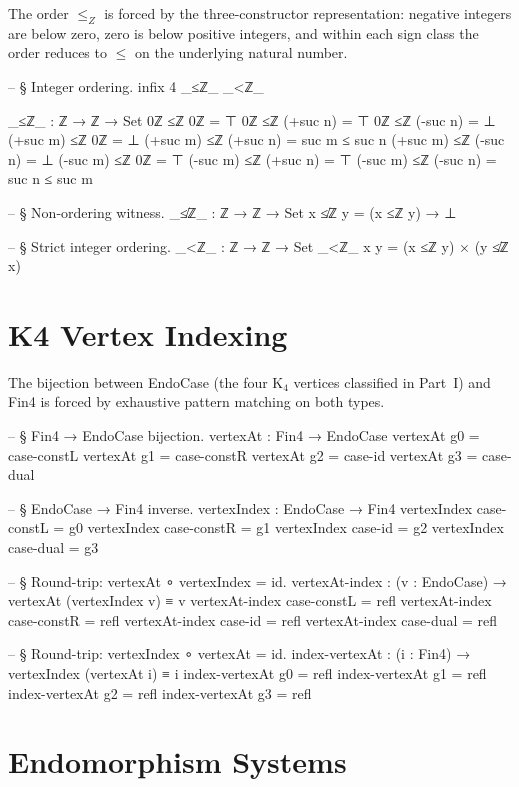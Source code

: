 \documentclass[11pt,a4paper]{book}
\def\mathbb#1{#1}%
\def\texttt#1{#1}%
\def\texorpdfstring#1#2{#2}%
\begin{document}
The order $\le_{\mathbb{Z}}$ is forced by the three-constructor representation:
negative integers are below zero, zero is below positive integers, and within each
sign class the order reduces to $\le$ on the underlying natural number.

\begin{code}
-- § Integer ordering.
infix 4 _≤ℤ_ _<ℤ_

_≤ℤ_ : ℤ → ℤ → Set
0ℤ ≤ℤ 0ℤ = ⊤
0ℤ ≤ℤ (+suc n) = ⊤
0ℤ ≤ℤ (-suc n) = ⊥
(+suc m) ≤ℤ 0ℤ = ⊥
(+suc m) ≤ℤ (+suc n) = suc m ≤ suc n
(+suc m) ≤ℤ (-suc n) = ⊥
(-suc m) ≤ℤ 0ℤ = ⊤
(-suc m) ≤ℤ (+suc n) = ⊤
(-suc m) ≤ℤ (-suc n) = suc n ≤ suc m

-- § Non-ordering witness.
_≰ℤ_ : ℤ → ℤ → Set
x ≰ℤ y = (x ≤ℤ y) → ⊥

-- § Strict integer ordering.
_<ℤ_ : ℤ → ℤ → Set
_<ℤ_ x y = (x ≤ℤ y) × (y ≰ℤ x)
\end{code}

\section{K\texorpdfstring{$_4$}{4} Vertex Indexing}

The bijection between \texttt{EndoCase} (the four K$_4$ vertices classified in
Part~I) and \texttt{Fin4} is forced by exhaustive pattern matching on both types.

\begin{code}
-- § Fin4 → EndoCase bijection.
vertexAt : Fin4 → EndoCase
vertexAt g0 = case-constL
vertexAt g1 = case-constR
vertexAt g2 = case-id
vertexAt g3 = case-dual

-- § EndoCase → Fin4 inverse.
vertexIndex : EndoCase → Fin4
vertexIndex case-constL = g0
vertexIndex case-constR = g1
vertexIndex case-id     = g2
vertexIndex case-dual   = g3

-- § Round-trip: vertexAt ∘ vertexIndex = id.
vertexAt-index : (v : EndoCase) → vertexAt (vertexIndex v) ≡ v
vertexAt-index case-constL = refl
vertexAt-index case-constR = refl
vertexAt-index case-id     = refl
vertexAt-index case-dual   = refl

-- § Round-trip: vertexIndex ∘ vertexAt = id.
index-vertexAt : (i : Fin4) → vertexIndex (vertexAt i) ≡ i
index-vertexAt g0 = refl
index-vertexAt g1 = refl
index-vertexAt g2 = refl
index-vertexAt g3 = refl
\end{code}

\section{Endomorphism Systems}
\end{document}
